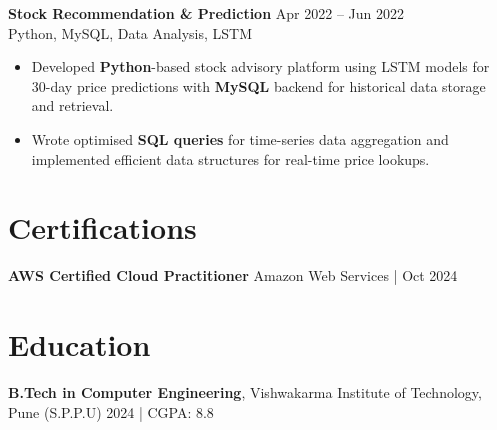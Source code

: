 \documentclass[10pt,letterpaper]{article}
\newcommand{\resumeSubheading}[4]{%
  \textbf{#1} \hfill #2 \\
  #3 \hfill #4 \\
}
\begin{document}
\resumeSubheading{Stock Recommendation \& Prediction}{Apr 2022 -- Jun 2022}{}{Python, MySQL, Data Analysis, LSTM}
\begin{itemize}
    \item Developed \textbf{Python}-based stock advisory platform using LSTM models for 30-day price predictions with \textbf{MySQL} backend for historical data storage and retrieval.
    \item Wrote optimised \textbf{SQL queries} for time-series data aggregation and implemented efficient data structures for real-time price lookups.
\end{itemize}

\section*{Certifications}
\textbf{AWS Certified Cloud Practitioner} \hfill Amazon Web Services \enspace | \enspace Oct 2024

\section*{Education}
\textbf{B.Tech in Computer Engineering}, Vishwakarma Institute of Technology, Pune (S.P.P.U) \hfill 2024 | CGPA: 8.8
\end{document}
